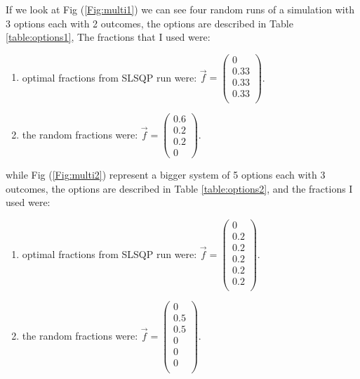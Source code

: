 \documentclass{article}
\begin{document}
	If we look at Fig (\ref{Fig:multi1}) we can see four random runs of a simulation with 3 options each with 2 outcomes, the options are described in Table \ref{table:options1}, The fractions that I used were:
	\begin{enumerate}
		\item optimal fractions from SLSQP run were: \begin{math}
			\overrightarrow{f} = 
			\begin{pmatrix}
				0 \\
				0.33 \\
				0.33 \\
				0.33 \\
			\end{pmatrix}
		\end{math}.
	\item the random fractions were: 
	\begin{math}
		\overrightarrow{f} = 
		\begin{pmatrix}
			0.6 \\
			0.2 \\
			0.2 \\
			0 
		\end{pmatrix}
	\end{math}.
	\end{enumerate}

	while Fig (\ref{Fig:multi2}) represent a bigger system of 5 options each with 3 outcomes, the options are described in Table \ref{table:options2}, and the fractions I used were:
	\begin{enumerate}
		\item optimal fractions from SLSQP run were: \begin{math}
			\overrightarrow{f} = 
			\begin{pmatrix}
				0 \\
				0.2 \\
				0.2 \\
				0.2 \\
				0.2 \\
				0.2 \\
			\end{pmatrix}
		\end{math}.
		\item the random fractions were: 
		\begin{math}
			\overrightarrow{f} = 
			\begin{pmatrix}
				0 \\
				0.5 \\
				0.5 \\
				0 \\
				0 \\
				0 \\
			\end{pmatrix}
		\end{math}.
	\end{enumerate}
	
\end{document}
